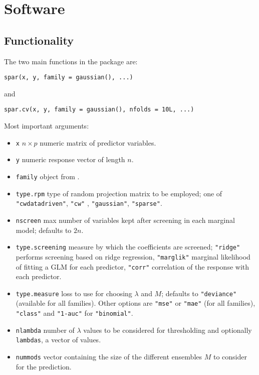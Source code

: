 \documentclass[
  article]{jss}
\newcommand{\fct}[1]{\code{#1()}}
\begin{document}
\section{Software}\label{sec-software}

\subsection{Functionality}\label{functionality}

The two main functions in the package are:

\begin{verbatim}
spar(x, y, family = gaussian(), ...)
\end{verbatim}

and

\begin{verbatim}
spar.cv(x, y, family = gaussian(), nfolds = 10L, ...)
\end{verbatim}

Most important arguments:

\begin{itemize}
\item
  \texttt{x} \(n \times p\) numeric matrix of predictor variables.
\item
  \texttt{y} numeric response vector of length \(n\).
\item
  \texttt{family} object from \fct{stats::family}.
\item
  \texttt{type.rpm} type of random projection matrix to be employed; one
  of \texttt{"cwdatadriven"}, \texttt{"cw"}
  \citet{Clarkson2013LowRankApproxShort}, \texttt{"gaussian"},
  \texttt{"sparse"}.
\item
  \texttt{nscreen} max number of variables kept after screening in each
  marginal model; defaults to \(2n\).
\item
  \texttt{type.screening} measure by which the coefficients are
  screened; \texttt{"ridge"} performs screening based on ridge
  regression, \texttt{"marglik"} marginal likelihood of fitting a GLM
  for each predictor, \texttt{"corr"} correlation of the response with
  each predictor.
\item
  \texttt{type.measure} loss to use for choosing \(\lambda\) and \(M\);
  defaults to \texttt{"deviance"} (available for all families). Other
  options are \texttt{"mse"} or \texttt{"mae"} (for all families),
  \texttt{"class"} and \texttt{"1-auc"} for \texttt{"binomial"}.
\item
  \texttt{nlambda} number of \(\lambda\) values to be considered for
  thresholding and optionally \texttt{lambdas}, a vector of values.
\item
  \texttt{nummods} vector containing the size of the different ensembles
  \(M\) to consider for the prediction.
\end{itemize}
\end{document}
